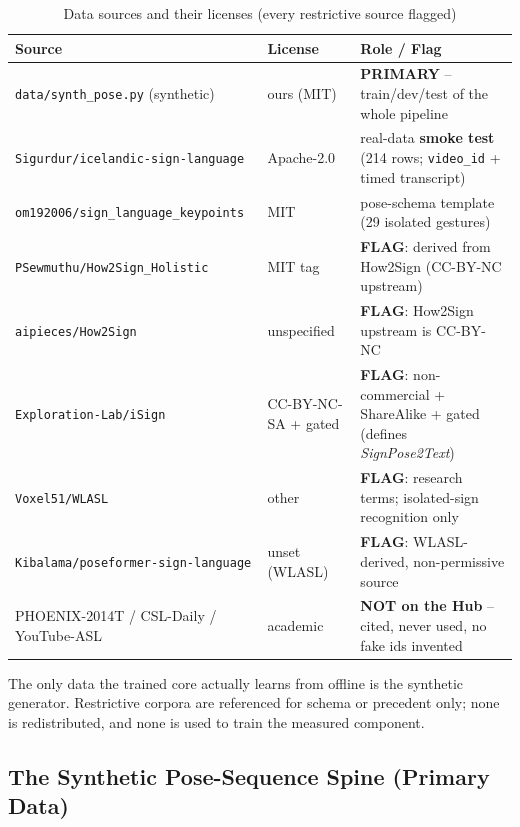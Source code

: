 \documentclass[12pt,a4paper]{article}
\begin{document}
\begin{table}[H]
\centering
\caption{Data sources and their licenses (every restrictive source flagged)}
\small
\begin{tabularx}{\linewidth}{@{} l l L @{}}
\toprule
\textbf{Source} & \textbf{License} & \textbf{Role / Flag} \\
\midrule
\texttt{data/synth\_pose.py} (synthetic) & ours (MIT) & \textbf{PRIMARY} -- train/dev/test of the whole pipeline \\
\texttt{Sigurdur/icelandic-sign-language} & Apache-2.0 & real-data \textbf{smoke test} (214 rows; \texttt{video\_id} + timed transcript) \\
\texttt{om192006/sign\_language\_keypoints} & MIT & pose-schema template (29 isolated gestures) \\
\texttt{PSewmuthu/How2Sign\_Holistic} & MIT tag & \textbf{FLAG}: derived from How2Sign (CC-BY-NC upstream) \\
\texttt{aipieces/How2Sign} & unspecified & \textbf{FLAG}: How2Sign upstream is CC-BY-NC \\
\texttt{Exploration-Lab/iSign} & CC-BY-NC-SA + gated & \textbf{FLAG}: non-commercial + ShareAlike + gated (defines \emph{SignPose2Text}) \\
\texttt{Voxel51/WLASL} & other & \textbf{FLAG}: research terms; isolated-sign recognition only \\
\texttt{Kibalama/poseformer-sign-language} & unset (WLASL) & \textbf{FLAG}: WLASL-derived, non-permissive source \\
PHOENIX-2014T / CSL-Daily / YouTube-ASL & academic & \textbf{NOT on the Hub} -- cited, never used, no fake ids invented \\
\bottomrule
\end{tabularx}
\end{table}

\noindent The only data the trained core actually learns from offline is the synthetic generator. Restrictive corpora are referenced for schema or precedent only; none is redistributed, and none is used to train the measured component.

\subsection{The Synthetic Pose-Sequence Spine (Primary Data)}
\end{document}
